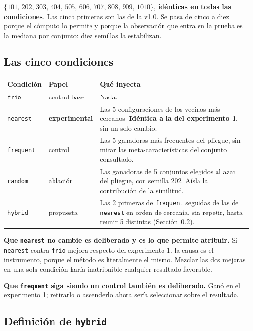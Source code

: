 \documentclass[11pt,letterpaper]{article}
\begin{document}
$\{101,\,202,\,303,\,404,\,505,\,606,\,707,\,808,\,909,\,1010\}$, \textbf{idénticas en
todas las condiciones}. Las cinco primeras son las de la v1.0. Se pasa de cinco a
diez porque el cómputo lo permite y porque la observación que entra en la prueba es
la mediana por conjunto: diez semillas la estabilizan.

\subsection{Las cinco condiciones}

\begin{center}
\begin{tabularx}{\textwidth}{L{2.3cm} L{2.7cm} Y}
\toprule
{} \textbf{Condición} & \textbf{Papel} & \textbf{Qué inyecta} \\
\midrule
\texttt{frio} & control base & Nada. \\
\midrule
\texttt{nearest} & \textbf{experimental} & Las 5 configuraciones de los vecinos más
cercanos. \textbf{Idéntica a la del experimento 1}, sin un solo cambio. \\
\midrule
\texttt{frequent} & control & Las 5 ganadoras más frecuentes del pliegue, sin mirar
las meta-características del conjunto consultado. \\
\midrule
\texttt{random} & ablación & Las ganadoras de 5 conjuntos elegidos al azar del
pliegue, con semilla 202. Aísla la contribución de la similitud. \\
\midrule
\texttt{hybrid} & propuesta & Las 2 primeras de \texttt{frequent} seguidas de las de
\texttt{nearest} en orden de cercanía, sin repetir, hasta reunir 5 distintas
(Sección~\ref{sec:hibrido}). \\
\bottomrule
\end{tabularx}
\end{center}

\textbf{Que \texttt{nearest} no cambie es deliberado y es lo que permite atribuir.}
Si \texttt{nearest} contra \texttt{frio} mejora respecto del experimento 1, la causa
es el instrumento, porque el método es literalmente el mismo. Mezclar las dos
mejoras en una sola condición haría inatribuible cualquier resultado favorable.

\textbf{Que \texttt{frequent} siga siendo un control también es deliberado.} Ganó en
el experimento 1; retirarlo o ascenderlo ahora sería seleccionar sobre el resultado.

\subsection{Definición de \texttt{hybrid}}
\label{sec:hibrido}
\end{document}

